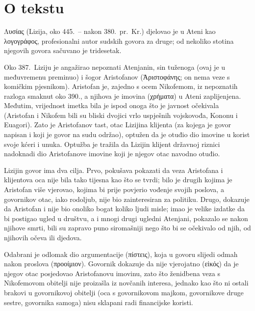 


\section*{O tekstu}

Λυσίας (Lizija, oko 445.\ – nakon 380.\ pr.~Kr.) djelovao je u Ateni kao \textgreek[variant=ancient]{λογογράφος}, profesionalni autor sudskih govora za druge; od nekoliko stotina njegovih govora sačuvano je tridesetak.

Oko 387.\ Liziju je angažirao nepoznati Atenjanin, sin tuženoga (ovaj je u međuvremenu preminuo) i šogor Aristofanov (\textgreek[variant=ancient]{Ἀριστοφάνης}; on nema veze s komičkim pjesnikom). Aristofan je, zajedno s ocem Nikofemom, iz nepoznatih razloga smaknut oko 390., a njihova je imovina (\textgreek[variant=ancient]{χρήματα}) u Ateni zaplijenjena. Međutim, vrijednost imetka bila je ispod onoga što je javnost očekivala (Aristofan i Nikofem bili su bliski dvojici vrlo uspješnih vojskovođa, Kononu i Euagori). Zato je Aristofanov tast, otac Lizijina klijenta (za kojega je govor napisan i koji je govor na sudu održao), optužen da je otuđio dio imovine u korist svoje kćeri i unuka. Optužba je tražila da Lizijin klijent državnoj riznici nadoknadi dio Aristofanove imovine koji je njegov otac navodno otuđio.

Lizijin govor ima dva cilja. Prvo, pokušava pokazati da veza Aristofana i klijentova oca nije bila tako tijesna kao što se tvrdi; bilo je drugih kojima je Aristofan više vjerovao, kojima bi prije povjerio vođenje svojih poslova, a govornikov otac, iako rodoljub, nije bio zainteresiran za politiku. Drugo, dokazuje da Aristofan i nije bio onoliko bogat koliko ljudi misle; imao je velike izdatke da bi postigao ugled u društvu, a i mnogi drugi ugledni Atenjani, pokazalo se nakon njihove smrti, bili su zapravo puno siromašniji nego što bi se očekivalo od njih, od njihovih očeva ili djedova.

Odabrani je odlomak dio argumentacije (πίστεις), koja u govoru slijedi odmah nakon proslova (προοίμιον). Govornik dokazuje da nije vjerojatno (εἰκός) da je njegov otac posjedovao Aristofanovu imovinu, zato što ženidbena veza s Nikofemovom obitelji nije proizašla iz novčanih interesa, jednako kao što ni ostali brakovi u govornikovoj obitelji (oca s govornikovom majkom, govornikove druge sestre, govornika samoga) nisu sklapani radi financijske koristi.


